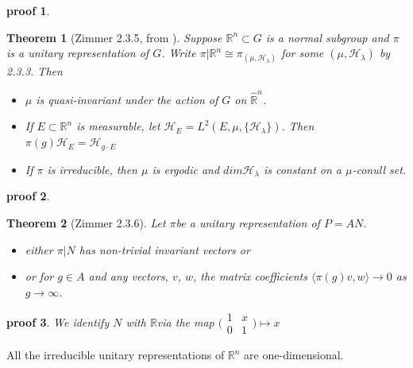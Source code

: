 \documentclass[
  12pt
]{article}
\theoremstyle{break}
\newtheorem{thm}{Theorem}
\theoremstyle{plain}
\newtheorem*{pf}{proof}
\newcommand{\mpi}{\ensuremath{\pi}}
\newcommand{\bbr}{\ensuremath{\mathbb{R}}}
\newcommand{\ipmatrix}[1]{%
\ensuremath{\big(\begin{smallmatrix} #1 \end{smallmatrix}\big)}}
\begin{document}
  \begin{pf}
    \label{pf:2.3.4}
  \end{pf}

  \begin{thm}[Zimmer 2.3.5, from  \cite{mackey76}]
    \label{thm:2.3.5}
    Suppose $\mathbb{R}^n \subset G$ is a normal subgroup and $\pi$ is a unitary representation of $G$.
    Write $\pi | \mathbb{R}^n \cong \pi_{(\mu, \mathscr{H}_{\lambda})}$ for some
    $(\mu, \mathscr{H}_{\lambda})$ by 2.3.3. Then  
    \begin{itemize}
      \item $\mu$ is quasi-invariant under the action of $G$ on $\hat{\mathbb{R}}^n$. 
      \item If $E \subset \mathbb{R}^n$ is measurable, let
        $\mathscr{H}_E = L^2(E, \mu, \{\mathscr{H}_{\lambda}\})$.
        Then $\pi(g)\mathscr{H}_E = \mathscr{H}_{g \cdot E}$
      \item If $\pi$ is irreducible, then $\mu$ is ergodic and $dim\mathscr{H}_{\lambda}$ is
        constant on a $\mu$-conull set.
    \end{itemize}
  \end{thm}

  \begin{pf}
  \end{pf}

  \begin{thm}[Zimmer 2.3.6]
    \label{thm:2.3.6}
    Let \mpi be  a unitary representation of $P = AN$.
    \begin{itemize}
      \item either $\pi|N$ has non-trivial invariant vectors or
      \item or for $g \in A$ and any vectors, $v$, $w$, the matrix coefficients
        $\langle \pi(g)v, w \rangle \rightarrow 0$ as $g \rightarrow \infty$.
    \end{itemize}
  \end{thm}

  \begin{pf}
    We identify $N$ with \bbr via the map $\ipmatrix{1 & x \\ 0 & 1} \mapsto x$ 
  \end{pf}


  All the irreducible unitary
  representations of $\mathbb{R}^n$ are one-dimensional.
\end{document}

